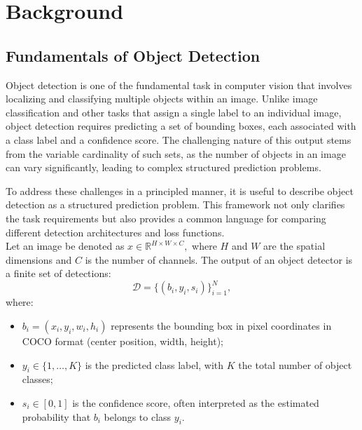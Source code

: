 \chapter{Background}
\label{ch:background}
\section{Fundamentals of Object Detection}

Object detection is one of the fundamental task in computer vision that involves localizing and classifying multiple objects within an image. Unlike image classification and other tasks that assign a single label to an individual image, object detection requires predicting a set of bounding boxes, each associated with a class label and a confidence score. The challenging nature of this output stems from the variable cardinality of such sets, as the number of objects in an image can vary significantly, leading to complex structured prediction problems.

To address these challenges in a principled manner, it is useful to describe object detection as a structured prediction problem. This framework not only clarifies the task requirements but also provides a common language for comparing different detection architectures and loss functions.\\

Let an image be denoted as 
$
x \in \mathbb{R}^{H \times W \times C},
$
where $H$ and $W$ are the spatial dimensions and $C$ is the number of channels.
The output of an object detector is a finite set of detections:
$$
\mathcal{D} = \{ (b_i, y_i, s_i) \}_{i=1}^N,
$$
where:
\begin{itemize}
    \item $b_i = (x_i, y_i, w_i, h_i)$ represents the bounding box in pixel coordinates in COCO format (center position, width, height);
    \item $y_i \in \{1, \dots, K\}$ is the predicted class label, with $K$ the total number of object classes;
    \item $s_i \in [0,1]$ is the confidence score, often interpreted as the estimated probability that $b_i$ belongs to class $y_i$.
\end{itemize}

